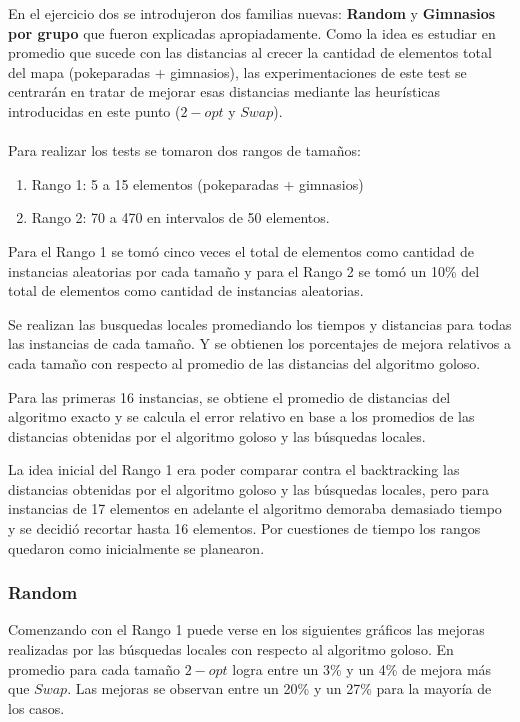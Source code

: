 \newpage

En el ejercicio dos se introdujeron dos familias nuevas: \textbf{Random} y \textbf{Gimnasios por grupo} que fueron explicadas apropiadamente. Como la idea es estudiar en promedio que sucede con las distancias al crecer la cantidad de elementos total del mapa (pokeparadas + gimnasios), las experimentaciones de este test se centrarán en tratar de mejorar esas distancias mediante las heurísticas introducidas en este punto ($2-opt$ y $Swap$).\\\\

Para realizar los tests se tomaron dos rangos de tamaños:
\begin{enumerate}
\item Rango 1: 5 a 15 elementos (pokeparadas + gimnasios)
\item Rango 2: 70 a 470 en intervalos de 50 elementos.
\end{enumerate}

Para el Rango 1 se tomó cinco veces el total de elementos como cantidad de instancias aleatorias por cada tamaño y para el Rango 2 se tomó un 10\% del total de elementos como cantidad de instancias aleatorias.

Se realizan las busquedas locales promediando los tiempos y distancias para todas las instancias de cada tamaño. Y se obtienen los porcentajes de mejora relativos a cada tamaño con respecto al promedio de las distancias del algoritmo goloso.
 
Para las primeras 16 instancias, se obtiene el promedio de distancias del algoritmo exacto y se calcula el error relativo en base a los promedios de las distancias obtenidas por el algoritmo goloso y las búsquedas locales.

La idea inicial del Rango 1 era poder comparar contra el backtracking las distancias obtenidas por el algoritmo goloso y las búsquedas locales, pero para instancias de 17 elementos en adelante el algoritmo demoraba demasiado tiempo y se decidió recortar hasta 16 elementos. Por cuestiones de tiempo los rangos quedaron como inicialmente se planearon.\\

\subsubsection*{Random}

Comenzando con el Rango 1 puede verse en los siguientes gráficos las mejoras realizadas por las búsquedas locales con respecto al algoritmo goloso. En promedio para cada tamaño $2-opt$ logra entre un 3\% y un 4\% de mejora más que $Swap$. Las mejoras se observan entre un 20\% y un 27\% para la mayoría de los casos.
\\\\

